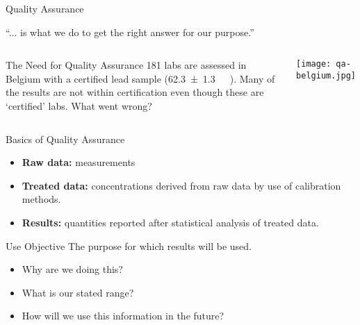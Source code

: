 \documentclass[notes=show]{beamer}
\begin{document}
\begin{frame}{Quality Assurance}
	\begin{center}
	``... is what we do to get the right answer for our purpose.''
	\end{center}

	\begin{columns}
		\begin{exampleblock}{The Need for Quality Assurance}
			181 labs are assessed in Belgium with a certified lead
			sample (\SI{62.3 +- 1.3}{\nano\Molar}~). Many of the
			results are not within certification even though these
			are `certified' labs. What went wrong?
		\end{exampleblock}
		\begin{center}
			\texttt{[image: qa-belgium.jpg]}
		\end{center}
	\end{columns}
\end{frame}

\begin{frame}{Basics of Quality Assurance}
	\begin{itemize}
		\item \textbf{Raw data:} measurements
		\item \textbf{Treated data:} concentrations derived from raw
			data \alert{by use of calibration methods}.
		\item \textbf{Results:} quantities reported \alert{after
			statistical analysis} of treated data.
	\end{itemize}

	\begin{block}{Use Objective}
		The purpose for which results will be used.

		\begin{itemize}
			\item Why are we doing this?
			\item What is our stated range?
			\item How will we use this information in the future?
		\end{itemize}
	\end{block}
\end{frame}
\end{document}
